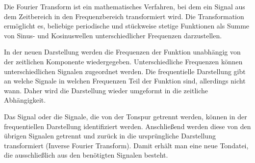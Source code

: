 Die Fourier Transform ist ein mathematisches Verfahren, bei dem ein Signal aus dem Zeitbereich in den Frequenzbereich transformiert wird. Die Transformation ermöglicht es, beliebige periodische und stückweise stetige Funktionen als Summe von Sinus- und Kosinuswellen unterschiedlicher Frequenzen darzustellen.

\par

 
\par

In der neuen Darstellung werden die Frequenzen der Funktion unabhängig von der zeitlichen Komponente wiedergegeben. Unterschiedliche Frequenzen können unterschiedlichen Signalen zugeordnet werden. Die frequentielle Darstellung gibt an welche Signale in welchen Frequenzen Teil der Funktion sind, allerdings nicht wann. Daher wird die Darstellung wieder umgeformt in die zeitliche Abhängigkeit.

\par

Das Signal oder die Signale, die von der Tonspur getrennt werden, können in der frequentiellen Darstellung identifiziert werden. Anschließend werden diese von den übrigen Signalen getrennt und zurück in die ursprüngliche Darstellung transformiert (Inverse Fourier Transform). Damit erhält man eine neue Tondatei, die ausschließlich aus den benötigten Signalen besteht.








